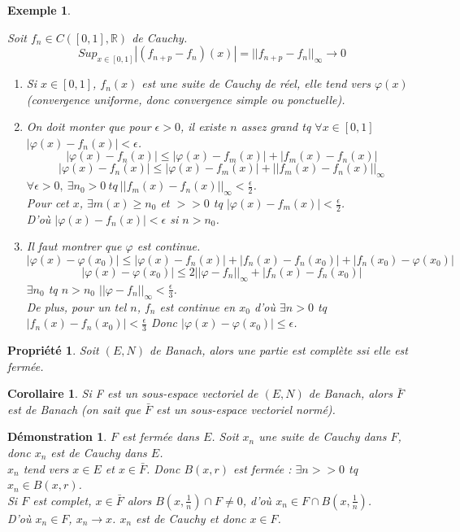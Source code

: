 \documentclass[a4paper, oneside]{report}
\theoremstyle{break}
\newtheorem{propr}[thm]{Propriété}
\newtheorem{cor}[thm]{Corollaire}
\newtheorem{exem}[thm]{Exemple}
\newtheorem*{demo}{Démonstration}
\newcommand{\R}{\mathbb{R}}
\newcommand{\sev}{sous-espace vectoriel }
\newcommand{\fracun}[1]{\frac{1}{#1}}
\begin{document}
\begin{exem}
\begin{enumerate}
Soit $f_n\in C([0,1],\R)$ de Cauchy.
$$Sup_{x\in [0,1]} |(f_{n+p}-f_n)(x)| = ||f_{n+p}-f_n||_\infty \rightarrow 0$$
\begin{enumerate}
\item Si $x\in [0,1]$, $f_n(x)$ est une suite de Cauchy de réel, elle tend vers $\varphi(x)$ (convergence uniforme, donc convergence simple ou ponctuelle).\\
\item On doit monter que pour $\epsilon >0$, il existe $n$ assez grand tq $\forall x\in [0,1]$ $|\varphi(x)-f_n(x)|<\epsilon$.\\
$$|\varphi(x)-f_n(x)| \leq |\varphi(x)-f_m(x)|+|f_m(x)-f_n(x)|$$
$$|\varphi(x)-f_n(x)| \leq  |\varphi(x)-f_m(x)|+||f_m(x)-f_n(x)||_\infty$$
$\forall \epsilon >0,~ \exists n_0>0~tq~||f_m(x)-f_n(x)||_\infty < \frac{\epsilon}{2}$.\\
Pour cet $x$, $\exists m(x)\geq n_0$ et $>>0$ tq $|\varphi(x)-f_m(x)|< \frac{\epsilon}{2}$.\\
D'où $|\varphi(x)-f_n(x)|< \epsilon$ si $n>n_0$.\\
\item Il faut montrer que $\varphi$ est continue.
$$|\varphi(x)-\varphi(x_0)|\leq  |\varphi(x)-f_n(x)|+|f_n(x)-f_n(x_0)|+|f_n(x_0)-\varphi(x_0)|$$
$$|\varphi(x)-\varphi(x_0)|\leq 2 ||\varphi - f_n||_\infty + |f_n(x)-f_n(x_0)|$$
$\exists n_0$ tq $n>n_0$ $||\varphi -f_n||_\infty <\frac{\epsilon}{3}$.\\
De plus, pour un tel $n$, $f_n$ est continue en $x_0$ d'où $\exists n>0$ tq $|f_n(x)-f_n(x_0)|<\frac{\epsilon}{3}$
Donc $|\varphi(x)-\varphi(x_0)|\leq \epsilon$.
\end{enumerate}
\end{enumerate}

\end{exem}


\begin{propr}
Soit $(E,N)$ de Banach, alors une partie est complète ssi elle est fermée.\\
\end{propr}



\begin{cor}
Si F est un \sev de $(E,N)$ de Banach, alors $\bar{F}$ est de Banach (on sait que $\bar{F}$ est un \sev normé).
\end{cor}


\begin{demo}
$F$ est fermée dans $E$. Soit $x_n$ une suite de Cauchy dans $F$, donc $x_n$ est de Cauchy dans $E$.\\
$x_n$ tend vers $x \in E$ et $x\in \bar{F}$. Donc $B(x,r)$ est fermée : $\exists n>>0$ tq $x_n\in B(x,r)$.\\
Si $F$ est complet, $x\in \bar{F}$ alors $B(x,\fracun{n}) \cap F \neq 0$, d'où $x_n \in F\cap B(x,\fracun{n})$.\\
D'où $x_n\in F$, $x_n\rightarrow x$. $x_n$ est de Cauchy et donc $x\in F$.
\end{demo}
\end{document}
